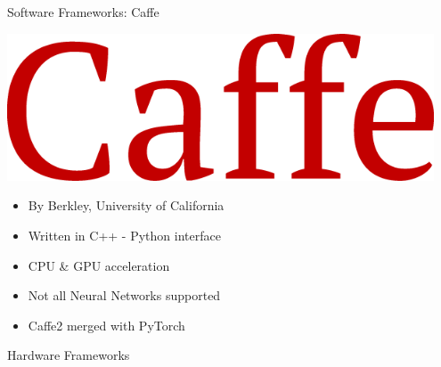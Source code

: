 \begin{frame}{Software Frameworks: Caffe}
	\begin{minipage}{0.4\textwidth}
		\centering
		\includegraphics[width=0.95\textwidth]{../Images/CNNArchitectures/caffe-logo.png}\\
	\end{minipage}%
	\begin{minipage}{0.6\textwidth}
		\begin{itemize}
			\item By Berkley, University of California
			\item Written in C++ - Python interface
			\item CPU \& GPU acceleration
			\item Not all Neural Networks supported
			\item Caffe2 merged with PyTorch
		\end{itemize}
	\end{minipage}
\end{frame}

\begin{frame}
	\centering
	\huge Hardware Frameworks
\end{frame}


